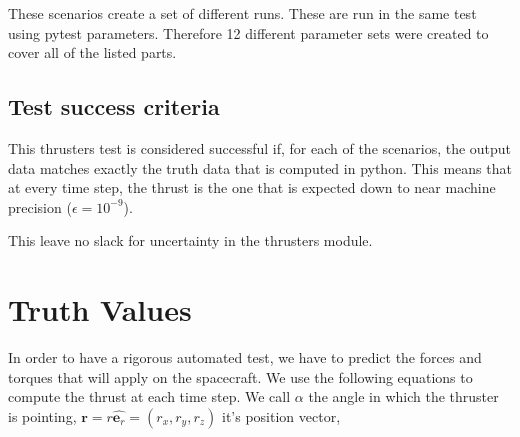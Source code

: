 \documentclass[]{BasiliskReportMemo}
\begin{document}
These scenarios create a set of different runs. These are run in the same test using pytest parameters. Therefore 12 different parameter sets were created to cover all of the listed parts.

\subsection{Test success criteria}

This thrusters test is considered successful if, for each of the scenarios, the output data matches exactly the truth data that is computed in python. This means that at every time step, the thrust is the one that is expected down to near machine precision ($\epsilon = 10^{-9}$). 

This leave no slack for uncertainty in the thrusters module.

\section{Truth Values}

In order to have a rigorous automated test, we have to predict the forces and torques that will apply on the spacecraft. We use the following equations to compute the thrust at each time step. We call $\alpha$ the angle in which the thruster is pointing, $\bm r = r \hat{\bm e_r}= \left(r_x, r_y, r_z \right)$ it's position vector, 
\end{document}
